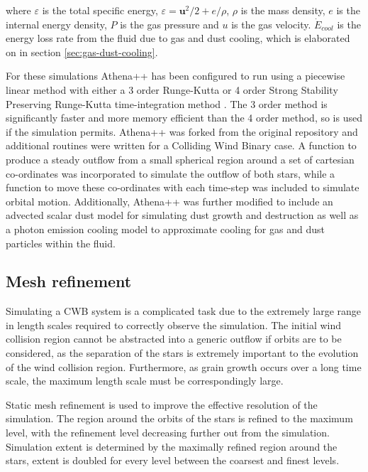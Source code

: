 where $\varepsilon$ is the total specific energy, $\varepsilon = \boldsymbol{u}^2/2 + e/\rho $, $\rho$ is the mass density, $e$ is the internal energy density, $P$ is the gas pressure and $u$ is the gas velocity. $\dot E_{cool}$ is the energy loss rate from the fluid due to gas and dust cooling, which is elaborated on in section \ref{sec:gas-dust-cooling}.


For these simulations Athena++ has been configured to run using a piecewise linear method with either a 3 order Runge-Kutta or 4 order Strong Stability Preserving Runge-Kutta time-integration method \cite{spiteriNewClassOptimal2002}. The 3 order method is significantly faster and more memory efficient than the 4 order method, so is used if the simulation permits. Athena++ was forked from the original repository and additional routines were written for a Colliding Wind Binary case. A function to produce a steady outflow from a small spherical region around a set of cartesian co-ordinates was incorporated to simulate the outflow of both stars, while a function to move these co-ordinates with each time-step was included to simulate orbital motion. Additionally, Athena++ was further modified to include an advected scalar dust model for simulating dust growth and destruction as well as a photon emission cooling model to approximate cooling for gas and dust particles within the fluid.

\subsection{Mesh refinement}


Simulating a CWB system is a complicated task due to the extremely large range in length scales required to correctly observe the simulation. The initial wind collision region cannot be abstracted into a generic outflow if orbits are to be considered, as the separation of the stars is extremely important to the evolution of the wind collision region. Furthermore, as grain growth occurs over a long time scale, the maximum length scale must be correspondingly large. 

Static mesh refinement is used to improve the effective resolution of the simulation. The region around the orbits of the stars is refined to the maximum level, with the refinement level decreasing further out from the simulation. Simulation extent is determined by the maximally refined region around the stars, extent is doubled for every level between the coarsest and finest levels.

